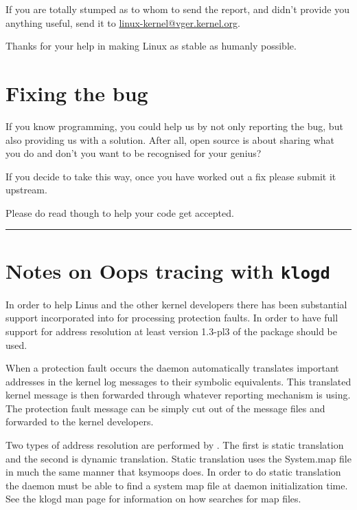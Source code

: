 \documentclass[a4paper,8pt,english]{sphinxmanual}
\begin{document}
If you are totally stumped as to whom to send the report, and
 didn't provide you anything useful, send it to
\href{mailto:linux-kernel@vger.kernel.org}{linux-kernel@vger.kernel.org}.

Thanks for your help in making Linux as stable as humanly possible.


\section{Fixing the bug}
\label{admin-guide/bug-hunting:fixing-the-bug}
If you know programming, you could help us by not only reporting the bug,
but also providing us with a solution. After all, open source is about
sharing what you do and don't you want to be recognised for your genius?

If you decide to take this way, once you have worked out a fix please submit
it upstream.

Please do read
 though
to help your code get accepted.


\bigskip\hrule{}\bigskip



\section{Notes on Oops tracing with \texttt{klogd}}
\label{admin-guide/bug-hunting:notes-on-oops-tracing-with-klogd}
In order to help Linus and the other kernel developers there has been
substantial support incorporated into  for processing protection
faults.  In order to have full support for address resolution at least
version 1.3-pl3 of the  package should be used.

When a protection fault occurs the  daemon automatically
translates important addresses in the kernel log messages to their
symbolic equivalents.  This translated kernel message is then
forwarded through whatever reporting mechanism  is using.  The
protection fault message can be simply cut out of the message files
and forwarded to the kernel developers.

Two types of address resolution are performed by .  The first is
static translation and the second is dynamic translation.  Static
translation uses the System.map file in much the same manner that
ksymoops does.  In order to do static translation the  daemon
must be able to find a system map file at daemon initialization time.
See the klogd man page for information on how  searches for map
files.
\end{document}
